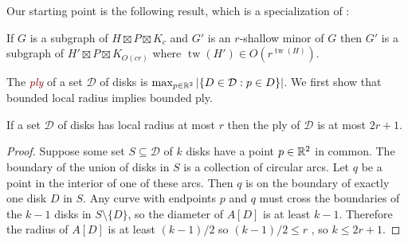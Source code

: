\documentclass{patmorin}
\newcommand{\defin}[1]{\textcolor{Maroon}{\emph{#1}}}
\DeclareMathOperator{\tw}{tw}
\begin{document}
Our starting point is the following result, which is a specialization of \citet[Theorem~7]{hickingbotham.wood:shallow}:

\begin{thm}\label{h_w_shallow_minor}
  If $G$ is a subgraph of $H\boxtimes P\boxtimes K_c$ and $G'$ is an $r$-shallow minor of $G$ then $G'$ is a subgraph of $H' \boxtimes P \boxtimes K_{O(cr)}$ where $\tw(H') \in O(r^{\tw(H)})$.
\end{thm}

The \defin{ply} of a set $\mathcal{D}$ of disks is $\max_{p\in\mathbb{R}^2}|\{D\in\mathcal{D}:p\in D\}|$.  We first show that bounded local radius implies bounded ply.

\begin{lem}\label{ply}
  If a set $\mathcal{D}$ of disks has local radius at most $r$ then the ply of $\mathcal{D}$ is at most $2r+1$.
\end{lem}

\begin{proof}
  Suppose some set $S\subseteq\mathcal{D}$ of $k$ disks have a point $p\in \mathbb{R}^2$ in common.  The boundary of the union of disks in $S$ is a collection of circular arcs.  Let $q$ be a point in the interior of one of these arcs.  Then $q$ is on the boundary of exactly one disk $D$ in $S$.  Any curve with endpoints $p$ and $q$ must cross the boundaries of the $k-1$ disks in $S \setminus \{D\}$, so the diameter of $A[D]$ is at least $k-1$.  Therefore the radius of $A[D]$ is at least $(k-1)/2$ so $(k - 1)/2 \le r$ , so $k \le  2r+1$.
\end{proof}
\end{document}

